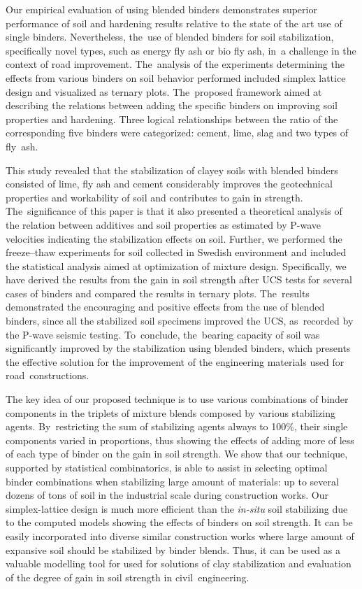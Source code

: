 \documentclass[constrmater,article,accept,pdftex,moreauthors]{Definitions/mdpi}
\begin{document}
Our empirical evaluation of using blended binders demonstrates superior performance of soil and hardening results relative to the state of the art use of single binders. Nevertheless, the~use of blended binders for soil stabilization, specifically novel types, such as energy fly ash or bio fly ash, in~a challenge in the context of road improvement. The~analysis of the experiments determining the effects from various binders on soil behavior performed included simplex lattice design and visualized as ternary plots. The~proposed framework aimed at describing the relations between adding the specific binders on improving soil properties and hardening. Three logical relationships between the ratio of the corresponding five binders were categorized: cement, lime, slag and two types of fly~ash. 

This study revealed that the stabilization of clayey soils with blended binders consisted of lime, fly ash and cement considerably improves the geotechnical properties and workability of soil and contributes to gain in strength. The~significance of this paper is that it also presented a theoretical analysis of the relation between additives and soil properties as estimated by P-wave velocities indicating the stabilization effects on soil. Further, we performed the freeze--thaw experiments for soil collected in Swedish environment and included the statistical analysis aimed at optimization of mixture design. Specifically, we have derived the results from the gain in soil strength after UCS tests for several cases of binders and compared the results in ternary plots. The~results demonstrated the encouraging and positive effects from the use of blended binders, since all the stabilized soil specimens improved the UCS, as~recorded by the P-wave seismic testing. To~conclude, the~bearing capacity of soil was significantly improved by the stabilization using blended binders, which presents the effective solution for the improvement of the engineering materials used for road~constructions.

The key idea of our proposed technique is to use various combinations of binder components in the triplets of mixture blends composed by various stabilizing agents. By~restricting the sum of stabilizing agents always to 100\%, their single components varied in proportions, thus showing the effects of adding more of less of each type of binder on the gain in soil strength. We show that our technique, supported by statistical combinatorics, is able to assist in selecting optimal binder combinations when stabilizing large amount of materials: up to several dozens of tons of soil in the industrial scale during construction works. Our simplex-lattice design is much more efficient than the \emph{in-situ} soil stabilizing due to the computed models showing the effects of  binders on soil strength. It can be easily incorporated into diverse similar construction works where large amount of expansive soil should be stabilized by binder blends. Thus, it can be used as a valuable modelling tool for used for solutions of clay stabilization and evaluation of the degree of gain in soil strength in civil~engineering.
\vspace{6pt}
\end{document}
